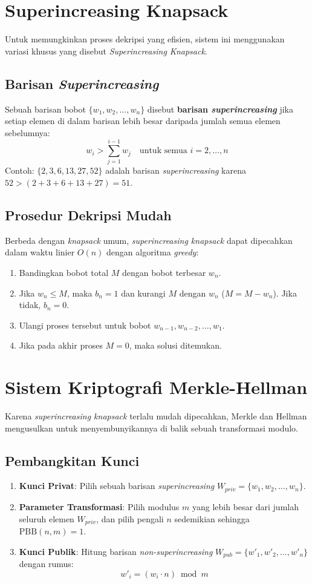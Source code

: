 \documentclass[../main.tex]{subfiles}
\begin{document}
\section{Superincreasing Knapsack}
Untuk memungkinkan proses dekripsi yang efisien, sistem ini menggunakan variasi khusus yang disebut \textit{Superincreasing Knapsack}.

\subsection{Barisan \textit{Superincreasing}}
Sebuah barisan bobot $\{w_1, w_2, \dots, w_n\}$ disebut \textbf{barisan \textit{superincreasing}} jika setiap elemen di dalam barisan lebih besar daripada jumlah semua elemen sebelumnya:
\[ w_i > \sum_{j=1}^{i-1} w_j \quad \text{untuk semua } i = 2, \dots, n \]
Contoh: $\{2, 3, 6, 13, 27, 52\}$ adalah barisan \textit{superincreasing} karena $52 > (2+3+6+13+27) = 51$.

\subsection{Prosedur Dekripsi Mudah}
Berbeda dengan \textit{knapsack} umum, \textit{superincreasing knapsack} dapat dipecahkan dalam waktu linier $O(n)$ dengan algoritma \textit{greedy}:
\begin{enumerate}
    \item Bandingkan bobot total $M$ dengan bobot terbesar $w_n$.
    \item Jika $w_n \le M$, maka $b_n = 1$ dan kurangi $M$ dengan $w_n$ ($M = M - w_n$). Jika tidak, $b_n = 0$.
    \item Ulangi proses tersebut untuk bobot $w_{n-1}, w_{n-2}, \dots, w_1$.
    \item Jika pada akhir proses $M = 0$, maka solusi ditemukan.
\end{enumerate}

\section{Sistem Kriptografi Merkle-Hellman}
Karena \textit{superincreasing knapsack} terlalu mudah dipecahkan, Merkle dan Hellman mengusulkan untuk menyembunyikannya di balik sebuah transformasi modulo.

\subsection{Pembangkitan Kunci}
\begin{enumerate}
    \item \textbf{Kunci Privat}: Pilih sebuah barisan \textit{superincreasing} $W_{priv} = \{w_1, w_2, \dots, w_n\}$.
    \item \textbf{Parameter Transformasi}: Pilih modulus $m$ yang lebih besar dari jumlah seluruh elemen $W_{priv}$, dan pilih pengali $n$ sedemikian sehingga $\text{PBB}(n, m) = 1$.
    \item \textbf{Kunci Publik}: Hitung barisan \textit{non-superincreasing} $W_{pub} = \{w'_1, w'_2, \dots, w'_n\}$ dengan rumus:
    \[ w'_i = (w_i \cdot n) \bmod m \]
\end{enumerate}
\end{document}
